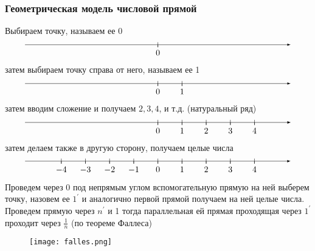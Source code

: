 \documentclass[a4paper, 12pt]{article}
\theoremstyle{definition}
\begin{document}
    \subsubsection{Геометрическая модель числовой прямой}
    Выбираем точку, называем ее 0
    \[\begin{tikzpicture}
        \draw[-latex] (-5.5,0) -- (5.5,0) ;
        \foreach \x in  {0}
        \draw[shift={(\x,0)},color=black] (0pt,3pt) -- (0pt,-3pt);
        \foreach \x in {0}
        \draw[shift={(\x,0)},color=black] (0pt,0pt) -- (0pt,-3pt) node[below] 
        {$\x$};
        \end{tikzpicture}\]
        затем выбираем точку справа от него, называем ее 1
        \[\begin{tikzpicture}
        \draw[-latex] (-5.5,0) -- (5.5,0) ;
        \foreach \x in {0,1}
        \draw[shift={(\x,0)},color=black] (0pt,3pt) -- (0pt,-3pt);
        \foreach \x in {0,1}
        \draw[shift={(\x,0)},color=black] (0pt,0pt) -- (0pt,-3pt) node[below] 
        {$\x$};
        \end{tikzpicture}\]
        затем вводим сложение и получаем $2, 3, 4$, и т.д. (натуральный ряд)
        \[\begin{tikzpicture}
        \draw[-latex] (-5.5,0) -- (5.5,0) ;
        \foreach \x in {0,1,2,3,4}
        \draw[shift={(\x,0)},color=black] (0pt,3pt) -- (0pt,-3pt);
        \foreach \x in {0,1,2,3,4}
        \draw[shift={(\x,0)},color=black] (0pt,0pt) -- (0pt,-3pt) node[below] 
        {$\x$};
        \end{tikzpicture}\]
        затем делаем также в другую сторону, получаем целые числа
        \[\begin{tikzpicture}
        \draw[-latex] (-5.5,0) -- (5.5,0) ;
        \foreach \x in {-4,-3,-2,-1,0,1,2,3,4}
        \draw[shift={(\x,0)},color=black] (0pt,3pt) -- (0pt,-3pt);
        \foreach \x in {-4,-3,-2,-1,0,1,2,3,4}
        \draw[shift={(\x,0)},color=black] (0pt,0pt) -- (0pt,-3pt) node[below] 
        {$\x$};
        \end{tikzpicture}\]
        Проведем через 0 под непрямым углом вспомогательную прямую на ней выберем точку, назовем ее $1^{\prime}$ и аналогично первой прямой получаем на ней целые числа. Проведем прямую через $n^{\prime}$ и 1 тогда параллельная ей прямая проходящая через $1^{\prime}$ проходит через $\frac{1}{n}$ (по теореме Фаллеса)
        \begin{figure}[h]
            \centering
            \texttt{[image: falles.png]}
        \end{figure}\\
\end{document}
